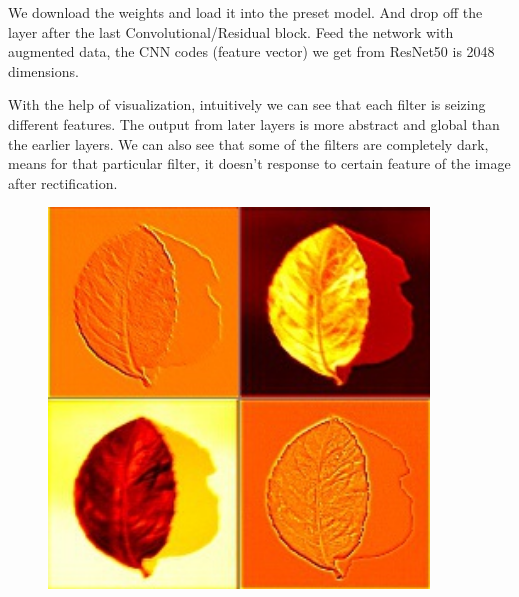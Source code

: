 \documentclass[journal, 10pt]{IEEEtran}
\begin{document}
  We download the weights and load it into the preset model. And drop off the layer after the last Convolutional/Residual block. Feed the network with augmented data, the CNN codes (feature vector) we get from ResNet50 is 2048 dimensions.

  With the help of visualization, intuitively we can see that each filter is seizing different features. The output from later layers is more abstract and global than the earlier layers. We can also see that some of the filters are completely dark, means for that particular filter, it doesn't response to certain feature of the image after rectification.

  \begin{figure}[H]
    \centering
    \begin{minipage}[b]{0.3\linewidth}
      \centering
      \includegraphics[width=0.9\textwidth]{33214-conv1.jpg}
      \vspace{4ex}
    \end{minipage}%
    \begin{minipage}[b]{0.3\linewidth}
      \centering

\end{minipage}
\end{figure}
\end{document}
